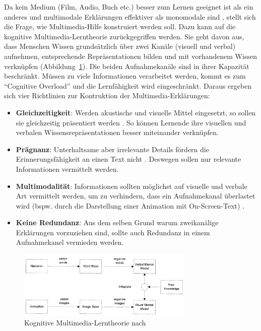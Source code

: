 \documentclass[
	headsepline,
	footsepline,
	fontsize=12pt,
	bibliography=totoc
]{scrbook}
\begin{document}

Da kein Medium (Film, Audio, Buch etc.) besser zum Lernen geeignet ist als ein anderes \cite{Clark1994, Kozma1994} und multimodale Erklärungen effektiver als monomodale sind \cite{Mayer2002}, stellt sich die Frage, wie Multimedia-Hilfe konstruiert werden soll. Dazu kann auf die kognitive Multimedia-Lerntheorie zurückgegriffen werden. Sie geht davon aus, dass Menschen Wissen grundsätzlich über zwei Kanäle (visuell und verbal) aufnehmen, entsprechende Repräsentationen bilden und mit vorhandenem Wissen verknüpfen (Abbildung~\ref{figure:kognitive_multimedia_lerntheorie}). Die beiden Aufnahmekanäle sind in ihrer Kapazität beschränkt. Müssen zu viele Informationen verarbeitet werden, kommt es zum \enquote{Cognitive Overload} und die Lernfähigkeit wird eingeschränkt. Daraus ergeben sich vier Richtlinien zur Kontruktion der Multimedia-Erklärungen:

\begin{itemize}
	\item \textbf{Gleichzeitigkeit}: Werden akustische und visuelle Mittel eingesetzt, so sollen sie gleichzeitig präsentiert werden \cite{Mayer1991}. So können Lernende ihre visuellen und verbalen Wissensrepräsentationen besser miteinander verknüpfen.
	\item \textbf{Prägnanz}: Unterhaltsame aber irrelevante Details fördern die Erinnerungsfähigkeit an einen Text nicht \cite{Garner1989}. Deswegen sollen nur relevante Informationen vermittelt werden.
	\item \textbf{Multimodalität}: Informationen sollten möglichst auf visuelle und verbale Art vermittelt werden, um zu verhindern, dass ein Aufnahmekanal überlastet wird (bspw. durch die Darstellung einer Animation mit On-Screen-Text) \cite{Moreno1999}.
	\item \textbf{Keine Redundanz}: Aus dem selben Grund warum zweikanälige Erklärungen vorzuziehen sind, sollte auch Redundanz in einem Aufnahmekanel vermieden werden.
\end{itemize}

\begin{figure}[htbp]
   \centering
   \includegraphics[width=0.75\textwidth]{images/grundlagen-kognitive_multimedia_lerntheorie.png}
   \caption{Kognitive Multimedia-Lerntheorie nach \cite{Mayer2002}}
   \label{figure:kognitive_multimedia_lerntheorie}
\end{figure}
\end{document}
